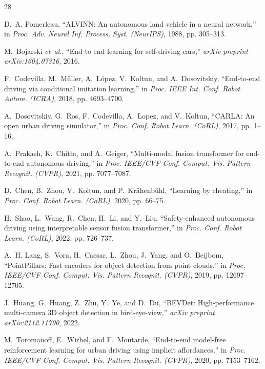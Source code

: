 \documentclass[conference]{IEEEtran}
\begin{document}

\def\IEEEbibitemsep{-2.0pt plus .1pt}
\begin{thebibliography}{28}

D.~A. Pomerleau, ``ALVINN: An autonomous land vehicle in a neural network,'' in \emph{Proc. Adv. Neural Inf. Process. Syst. (NeurIPS)}, 1988, pp. 305--313.

M.~Bojarski \emph{et~al.}, ``End to end learning for self-driving cars,'' \emph{arXiv preprint arXiv:1604.07316}, 2016.

F.~Codevilla, M.~M{\"u}ller, A.~L{\'o}pez, V.~Koltun, and A.~Dosovitskiy, ``End-to-end driving via conditional imitation learning,'' in \emph{Proc. IEEE Int. Conf. Robot. Autom. (ICRA)}, 2018, pp. 4693--4700.

A.~Dosovitskiy, G.~Ros, F.~Codevilla, A.~Lopez, and V.~Koltun, ``CARLA: An open urban driving simulator,'' in \emph{Proc. Conf. Robot Learn. (CoRL)}, 2017, pp. 1--16.

A.~Prakash, K.~Chitta, and A.~Geiger, ``Multi-modal fusion transformer for end-to-end autonomous driving,'' in \emph{Proc. IEEE/CVF Conf. Comput. Vis. Pattern Recognit. (CVPR)}, 2021, pp. 7077--7087.

D.~Chen, B.~Zhou, V.~Koltun, and P.~Kr{\"a}henb{\"u}hl, ``Learning by cheating,'' in \emph{Proc. Conf. Robot Learn. (CoRL)}, 2020, pp. 66--75.

H.~Shao, L.~Wang, R.~Chen, H.~Li, and Y.~Liu, ``Safety-enhanced autonomous driving using interpretable sensor fusion transformer,'' in \emph{Proc. Conf. Robot Learn. (CoRL)}, 2022, pp. 726--737.

A.~H. Lang, S.~Vora, H.~Caesar, L.~Zhou, J.~Yang, and O.~Beijbom, ``PointPillars: Fast encoders for object detection from point clouds,'' in \emph{Proc. IEEE/CVF Conf. Comput. Vis. Pattern Recognit. (CVPR)}, 2019, pp. 12697--12705.

J.~Huang, G.~Huang, Z.~Zhu, Y.~Ye, and D.~Du, ``BEVDet: High-performance multi-camera 3D object detection in bird-eye-view,'' \emph{arXiv preprint arXiv:2112.11790}, 2022.

M.~Toromanoff, E.~Wirbel, and F.~Moutarde, ``End-to-end model-free reinforcement learning for urban driving using implicit affordances,'' in \emph{Proc. IEEE/CVF Conf. Comput. Vis. Pattern Recognit. (CVPR)}, 2020, pp. 7153--7162.


\end{thebibliography}
\end{document}
